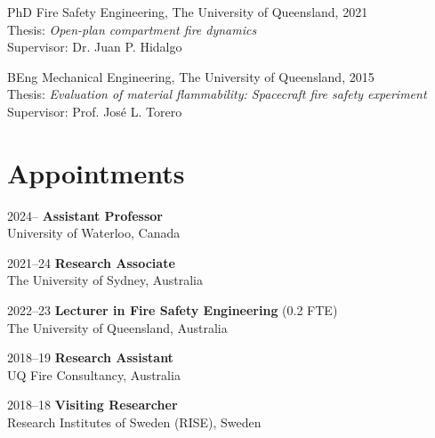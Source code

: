 \documentclass[12pt,letterpaper]{report}
\begin{document}
    \begin{tablist}

        \item[PhD] \tab{}Fire Safety Engineering, The University of Queensland, 2021
        \\ Thesis: \textit{Open-plan compartment fire dynamics}
        \\ Supervisor: Dr. Juan P. Hidalgo \\
        
        \item[BEng]  \tab{}Mechanical Engineering, The University of Queensland, 2015
        \\ Thesis: \textit{Evaluation of material flammability: Spacecraft fire safety experiment}
        \\ Supervisor: Prof. Jos\'{e} L. Torero

    \end{tablist}

    \section*{Appointments}

    \begin{tablist}

        \item[2024--] \tab \textbf{Assistant Professor} \\
                          University of Waterloo, Canada \\
 
        \item[2021--24] \tab \textbf{Research Associate} \\
                          The University of Sydney, Australia \\

		\item[2022--23] \tab \textbf{Lecturer in Fire Safety Engineering} (0.2 FTE) \\
                          The University of Queensland, Australia \\	

        \item[2018--19] \tab \textbf{Research Assistant} \\
                          UQ Fire Consultancy, Australia \\
 
        \item[2018--18] \tab \textbf{Visiting Researcher} \\
                           Research Institutes of Sweden (RISE), Sweden   \\

    \end{tablist}
\end{document}

